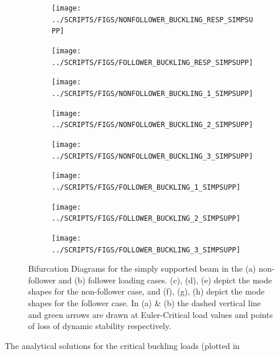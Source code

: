 \documentclass[10pt]{article}
\begin{document}
\begin{figure}[!h]
  \centering
  \begin{subfigure}{0.5\linewidth}
    \centering
    \texttt{[image: ../SCRIPTS/FIGS/NONFOLLOWER\_BUCKLING\_RESP\_SIMPSUPP]}
    \caption{}
  \end{subfigure}%
  \begin{subfigure}{0.5\linewidth}
    \centering
    \texttt{[image: ../SCRIPTS/FIGS/FOLLOWER\_BUCKLING\_RESP\_SIMPSUPP]}
    \caption{}
  \end{subfigure}%

  \begin{subfigure}{0.33\linewidth}
    \centering
    \texttt{[image: ../SCRIPTS/FIGS/NONFOLLOWER\_BUCKLING\_1\_SIMPSUPP]}
    \caption{}
  \end{subfigure}%
  \begin{subfigure}{0.33\linewidth}
    \centering
    \texttt{[image: ../SCRIPTS/FIGS/NONFOLLOWER\_BUCKLING\_2\_SIMPSUPP]}
    \caption{}
  \end{subfigure}%
  \begin{subfigure}{0.33\linewidth}
    \centering
    \texttt{[image: ../SCRIPTS/FIGS/NONFOLLOWER\_BUCKLING\_3\_SIMPSUPP]}
    \caption{}
  \end{subfigure}

  \begin{subfigure}{0.33\linewidth}
    \centering
    \texttt{[image: ../SCRIPTS/FIGS/FOLLOWER\_BUCKLING\_1\_SIMPSUPP]}
    \caption{}
  \end{subfigure}%
  \begin{subfigure}{0.33\linewidth}
    \centering
    \texttt{[image: ../SCRIPTS/FIGS/FOLLOWER\_BUCKLING\_2\_SIMPSUPP]}
    \caption{}
  \end{subfigure}%
  \begin{subfigure}{0.33\linewidth}
    \centering
    \texttt{[image: ../SCRIPTS/FIGS/FOLLOWER\_BUCKLING\_3\_SIMPSUPP]}
    \caption{}
  \end{subfigure}%
  \caption{Bifurcation Diagrams for the simply supported beam in the
    (a) non-follower and (b) follower loading cases. (c), (d), (e)
    depict the mode shapes for the non-follower case, and (f), (g),
    (h) depict the mode shapes for the follower case. In (a) \& (b)
    the dashed vertical line and green arrows are drawn at
    Euler-Critical load values and points of loss of dynamic stability
    respectively.}
  \label{fig:buckbif_simpsupp}
\end{figure}
The analytical solutions for the critical buckling loads (plotted in
\end{document}
